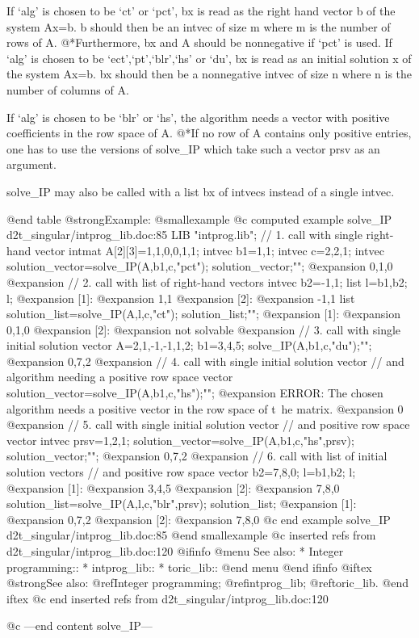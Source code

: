 If `alg' is chosen to be `ct' or `pct', bx is read as the right hand
vector b of the system Ax=b. b should then be an intvec of size m
where m is the number of rows of A.
@*Furthermore, bx and A should be nonnegative if `pct' is used.
If `alg' is chosen to be `ect',`pt',`blr',`hs' or `du',
bx is read as an initial solution x of the system Ax=b.
bx should then be a nonnegative intvec of size n where n is the
number of columns of A.

If `alg' is chosen to be `blr' or `hs', the algorithm needs a vector
with positive coefficients in the row space of A.
@*If no row of A contains only positive entries, one has to use the
versions of solve_IP which take such a vector prsv as an argument.

solve_IP may also be called with a list bx of intvecs instead of a
single intvec.

@end table
@strong{Example:}
@smallexample
@c computed example solve_IP d2t_singular/intprog_lib.doc:85 
LIB "intprog.lib";
// 1. call with single right-hand vector
intmat A[2][3]=1,1,0,0,1,1;
intvec b1=1,1;
intvec c=2,2,1;
intvec solution_vector=solve_IP(A,b1,c,"pct");
solution_vector;"";
@expansion{} 0,1,0
@expansion{} 
// 2. call with list of right-hand vectors
intvec b2=-1,1;
list l=b1,b2;
l;
@expansion{} [1]:
@expansion{}    1,1
@expansion{} [2]:
@expansion{}    -1,1
list solution_list=solve_IP(A,l,c,"ct");
solution_list;"";
@expansion{} [1]:
@expansion{}    0,1,0
@expansion{} [2]:
@expansion{}    not solvable
@expansion{} 
// 3. call with single initial solution vector
A=2,1,-1,-1,1,2;
b1=3,4,5;
solve_IP(A,b1,c,"du");"";
@expansion{} 0,7,2
@expansion{} 
// 4. call with single initial solution vector
//    and algorithm needing a positive row space vector
solution_vector=solve_IP(A,b1,c,"hs");"";
@expansion{} ERROR: The chosen algorithm needs a positive vector in the row space of t\
   he matrix.
@expansion{} 0
@expansion{} 
// 5. call with single initial solution vector
//     and positive row space vector
intvec prsv=1,2,1;
solution_vector=solve_IP(A,b1,c,"hs",prsv);
solution_vector;"";
@expansion{} 0,7,2
@expansion{} 
// 6. call with list of initial solution vectors
//    and positive row space vector
b2=7,8,0;
l=b1,b2;
l;
@expansion{} [1]:
@expansion{}    3,4,5
@expansion{} [2]:
@expansion{}    7,8,0
solution_list=solve_IP(A,l,c,"blr",prsv);
solution_list;
@expansion{} [1]:
@expansion{}    0,7,2
@expansion{} [2]:
@expansion{}    7,8,0
@c end example solve_IP d2t_singular/intprog_lib.doc:85
@end smallexample
@c inserted refs from d2t_singular/intprog_lib.doc:120
@ifinfo
@menu
See also:
* Integer programming::
* intprog_lib::
* toric_lib::
@end menu
@end ifinfo
@iftex
@strong{See also:}
@ref{Integer programming};
@ref{intprog_lib};
@ref{toric_lib}.
@end iftex
@c end inserted refs from d2t_singular/intprog_lib.doc:120

@c ---end content solve_IP---
